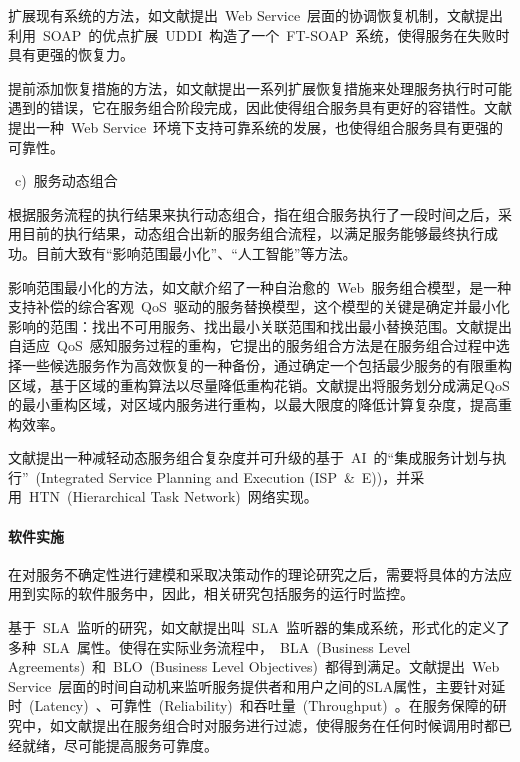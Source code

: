 扩展现有系统的方法，如文献\cite{cabrera2002web}提出~Web Service~层面的协调恢复机制，文献\cite{jeckle2003active}提出利用~SOAP~的优点扩展~UDDI~构造了一个~FT-SOAP~系统，使得服务在失败时具有更强的恢复力。

提前添加恢复措施的方法，如文献\cite{erradi2006recovery}提出一系列扩展恢复措施来处理服务执行时可能遇到的错误，它在服务组合阶段完成，因此使得组合服务具有更好的容错性。文献\cite{issarny2003coordinated}提出一种~Web Service~环境下支持可靠系统的发展，也使得组合服务具有更强的可靠性。

~c)~服务动态组合

根据服务流程的执行结果来执行动态组合，指在组合服务执行了一段时间之后，采用目前的执行结果，动态组合出新的服务组合流程，以满足服务能够最终执行成功。目前大致有“影响范围最小化”、“人工智能”等方法。

影响范围最小化的方法，如文献\cite{yin2009self}介绍了一种自治愈的~Web~服务组合模型，是一种支持补偿的综合客观~QoS~驱动的服务替换模型，这个模型的关键是确定并最小化影响的范围：找出不可用服务、找出最小关联范围和找出最小替换范围。文献\cite{li2011adaptive}提出自适应~QoS~感知服务过程的重构，它提出的服务组合方法是在服务组合过程中选择一些候选服务作为高效恢复的一种备份，通过确定一个包括最少服务的有限重构区域，基于区域的重构算法以尽量降低重构花销。文献\cite{lin2009efficient}提出将服务划分成满足QoS的最小重构区域，对区域内服务进行重构，以最大限度的降低计算复杂度，提高重构效率。

文献\cite{madhusudan2006declarative}提出一种减轻动态服务组合复杂度并可升级的基于~AI~的“集成服务计划与执行”~(Integrated Service Planning and Execution (ISP~\&~E))，并采用~HTN~(Hierarchical Task Network)~网络实现。

\paragraph{软件实施}

在对服务不确定性进行建模和采取决策动作的理论研究之后，需要将具体的方法应用到实际的软件服务中，因此，相关研究包括服务的运行时监控。

基于~SLA~监听的研究，如文献\cite{goel2011sla}提出叫~SLA~监听器的集成系统，形式化的定义了多种~SLA~属性。使得在实际业务流程中，~BLA~(Business Level Agreements)~和~BLO~(Business Level Objectives)~都得到满足。文献\cite{raimondi2008efficient}提出~Web Service~层面的时间自动机来监听服务提供者和用户之间的SLA属性，主要针对延时~(Latency)~、可靠性~(Reliability)~和吞吐量~(Throughput)~。在服务保障的研究中，如文献\cite{bravetti2007theory}\cite{bravetti2009theory}提出在服务组合时对服务进行过滤，使得服务在任何时候调用时都已经就绪，尽可能提高服务可靠度。

